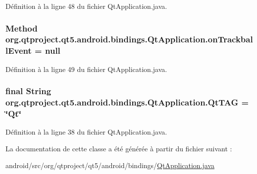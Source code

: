Définition à la ligne 48 du fichier Qt\-Application.\-java.

\hypertarget{classorg_1_1qtproject_1_1qt5_1_1android_1_1bindings_1_1_qt_application_aba0550a56d08380fb00cef9cc1a276d1}{
\subsubsection[{on\-Trackball\-Event}]{\setlength{\rightskip}{0pt plus 5cm}Method org.\-qtproject.\-qt5.\-android.\-bindings.\-Qt\-Application.\-on\-Trackball\-Event = null\hspace{0.3cm}{\ttfamily [static]}}}\label{classorg_1_1qtproject_1_1qt5_1_1android_1_1bindings_1_1_qt_application_aba0550a56d08380fb00cef9cc1a276d1}


Définition à la ligne 49 du fichier Qt\-Application.\-java.

\hypertarget{classorg_1_1qtproject_1_1qt5_1_1android_1_1bindings_1_1_qt_application_acf8f3131e19aaef5fc2079bc530f42d6}{
\subsubsection[{Qt\-T\-A\-G}]{\setlength{\rightskip}{0pt plus 5cm}final String org.\-qtproject.\-qt5.\-android.\-bindings.\-Qt\-Application.\-Qt\-T\-A\-G = \char`\"{}Qt\char`\"{}\hspace{0.3cm}{\ttfamily [static]}}}\label{classorg_1_1qtproject_1_1qt5_1_1android_1_1bindings_1_1_qt_application_acf8f3131e19aaef5fc2079bc530f42d6}


Définition à la ligne 38 du fichier Qt\-Application.\-java.



La documentation de cette classe a été générée à partir du fichier suivant \-:\begin{DoxyCompactItemize}
\item 
android/src/org/qtproject/qt5/android/bindings/\hyperlink{_qt_application_8java}{Qt\-Application.\-java}\end{DoxyCompactItemize}
